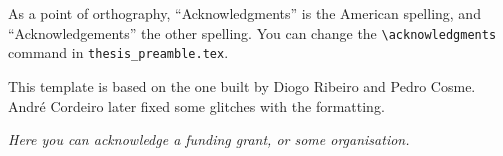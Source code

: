 \section*{\acknowledgments}


As a point of orthography, ``Acknowledgments'' is the American spelling, and ``Acknowledgements'' the other spelling. You can change the \verb|\acknowledgments| command in \texttt{thesis\_preamble.tex}.

This template is based on the one built by Diogo Ribeiro and Pedro Cosme. André Cordeiro later fixed some glitches with the formatting.


%
\vfill
%
{\centering %
\small{\it Here you can acknowledge a funding grant, or some organisation.}
}